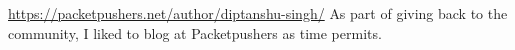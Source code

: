 

\begin{cventries}

  \cventry
    {\url{https://packetpushers.net/author/diptanshu-singh/}} %
    {As part of giving back to the community, I liked to blog at Packetpushers as time permits.} %
    {} %
    {} %
    {
      \begin{cvitems} %
      \end{cvitems}
    }
\end{cventries}
